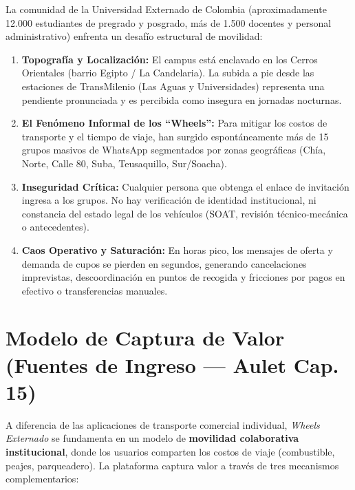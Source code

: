 \documentclass[11pt,a4paper]{article}
\begin{document}
La comunidad de la Universidad Externado de Colombia (aproximadamente 12.000 estudiantes de pregrado y posgrado, m\'as de 1.500 docentes y personal administrativo) enfrenta un desaf\'io estructural de movilidad:
\begin{enumerate}[leftmargin=*]
    \item \textbf{Topograf\'ia y Localizaci\'on:} El campus est\'a enclavado en los Cerros Orientales (barrio Egipto / La Candelaria). La subida a pie desde las estaciones de TransMilenio (Las Aguas y Universidades) representa una pendiente pronunciada y es percibida como insegura en jornadas nocturnas.
    \item \textbf{El Fen\'omeno Informal de los ``Wheels'':} Para mitigar los costos de transporte y el tiempo de viaje, han surgido espont\'aneamente m\'as de 15 grupos masivos de WhatsApp segmentados por zonas geogr\'aficas (Ch\'ia, Norte, Calle 80, Suba, Teusaquillo, Sur/Soacha).
    \item \textbf{Inseguridad Cr\'itica:} Cualquier persona que obtenga el enlace de invitaci\'on ingresa a los grupos. No hay verificaci\'on de identidad institucional, ni constancia del estado legal de los veh\'iculos (SOAT, revisi\'on t\'ecnico-mec\'anica o antecedentes).
    \item \textbf{Caos Operativo y Saturaci\'on:} En horas pico, los mensajes de oferta y demanda de cupos se pierden en segundos, generando cancelaciones imprevistas, descoordinaci\'on en puntos de recogida y fricciones por pagos en efectivo o transferencias manuales.
\end{enumerate}

\section{Modelo de Captura de Valor (Fuentes de Ingreso --- Aulet Cap. 15)}

A diferencia de las aplicaciones de transporte comercial individual, \textit{Wheels Externado} se fundamenta en un modelo de \textbf{movilidad colaborativa institucional}, donde los usuarios comparten los costos de viaje (combustible, peajes, parqueadero). La plataforma captura valor a trav\'es de tres mecanismos complementarios:
\end{document}
